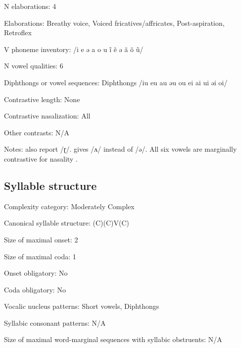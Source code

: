 {\begin{appendixdesc}
\item[N elaborations:] 4

\item[Elaborations:] Breathy voice, Voiced fricatives/affricates, Post-aspiration, Retroflex

\item[V phoneme inventory:] /i e ə a o u ĩ ẽ ə ã õ ũ/

\item[N vowel qualities:] 6

\item[Diphthongs or vowel sequences:] Diphthongs /iu eu au əu ou ei ai ui əi oi/

\item[Contrastive length:] None

\item[Contrastive nasalization:] All

\item[Other contrasts:] N/A

\item[Notes:] \citet{KotapishKotapish1973} also report /ɽ/. \citet{Paudyal2003} gives /ʌ/ instead of /ə/. All six vowels are marginally contrastive for nasality \citep[7]{Dhakal2012}.
\end{appendixdesc}
\subsection*{Syllable structure}
\begin{appendixdesc}

\item[Complexity category:] Moderately Complex

\item[Canonical syllable structure:] (C)(C)V(C) \citep[17--20]{Dhakal2012}

\item[Size of maximal onset:] 2

\item[Size of maximal coda:] 1

\item[Onset obligatory:] No

\item[Coda obligatory:] No

\item[Vocalic nucleus patterns:] Short vowels, Diphthongs

\item[Syllabic consonant patterns:] N/A

\item[Size of maximal word-marginal sequences with syllabic obstruents:] N/A


\end{appendixdesc}}
